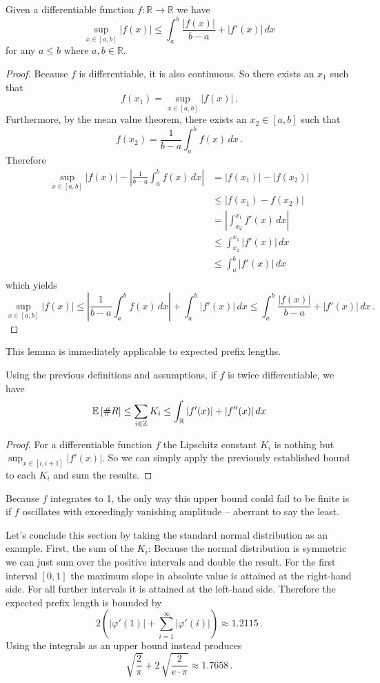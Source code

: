\begin{lemma}
	Given a differentiable function $f : \mathbb{R} \rightarrow \mathbb{R}$ we have
	\[
	\sup_{x\in[a,b]}|f(x)|\leq\int_a^b\frac{|f(x)|}{b-a}+|f'(x)|\,dx
	\]
	 for any $a\leq b$ where $a,b\in\mathbb{R}$.
\end{lemma}
\begin{proof}
Because $f$ is differentiable, it is also continuous. So there exists an $x_1$ such that
\[
f(x_1)=\sup_{x\in[a,b]}|f(x)|\,. 
\]
Furthermore, by the mean value theorem, there exists an $x_2\in[a,b]$ such that
\[
f(x_2)=\frac{1}{b-a}\int_a^b f(x)\,dx\,.
\]
Therefore
\[
\begin{split}
\sup_{x\in[a,b]}|f(x)|-\left|\frac{1}{b-a}\int_a^b f(x)\,dx\right|
& = |f(x_1)|-|f(x_2)|\\
& \leq |f(x_1)-f(x_2)|\\
& = \left|\int_{x_2}^{x_1}f'(x)\,dx\right|\\
& \leq \int_{x_2}^{x_1}|f'(x)|\,dx\\
& \leq \int_{a}^{b}|f'(x)|\,dx\\
\end{split}
\]
which yields
\[
\sup_{x\in[a,b]}|f(x)| \leq \left|\frac{1}{b-a}\int_a^b f(x)\,dx\right|+\int_{a}^{b}|f'(x)|\,dx\leq\int_a^b\frac{|f(x)|}{b-a}+|f'(x)|\,dx\,.
\]
\end{proof}

This lemma is immediately applicable to expected prefix lengths.

\begin{proposition}
	Using the previous definitions and assumptions, if $f$ is twice differentiable, we have
	\[
	\underset{}{\mathbb{E}}\left[\#R\right]\leq\sum_{i\in\mathbb{Z}} K_i\leq \int_\mathbb{R}|f'(x)|+|f''(x)|\,dx
	\]
\end{proposition}
\begin{proof}
For a differentiable function $f$ the Lipschitz constant $K_i$ is nothing but $\sup_{x\in[i,i+1]}|f'(x)|$. So we can simply apply the previously established bound to each $K_i$ and sum the results.
\end{proof}

Because $f$ integrates to 1, the only way this upper bound could fail to be finite is if $f$ oscillates with exceedingly vanishing amplitude -- aberrant to say the least.

Let's conclude this section by taking the standard normal distribution as an example. First, the sum of the $K_i$: Because the normal distribution is symmetric we can just sum over the positive intervals and double the result. For the first interval $[0,1]$ the maximum slope in absolute value is attained at the right-hand side. For all further intervals it is attained at the left-hand side. Therefore the expected prefix length is bounded by
\[
2\left(|\varphi'(1)|+\sum_{i=1}^\infty |\varphi'(i)|\right) \approx 1.2115\,.
\]
Using the integrals as an upper bound instead produces
\[
\sqrt{\frac{2}{\pi}}+2\,\sqrt{\frac{2}{e\cdot\pi}}\approx 1.7658\,.
\]

